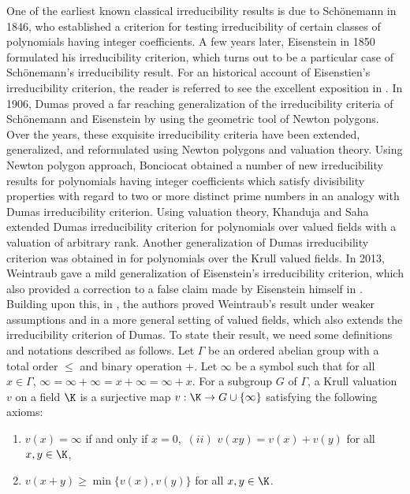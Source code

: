 \documentclass[12pt]{amsart}%
\begin{document}
One of the earliest known classical irreducibility results is due to Sch\"onemann \cite{S} in 1846, who established a criterion for testing irreducibility of certain classes of polynomials having integer coefficients. A few years later, Eisenstein \cite{E} in 1850  formulated his irreducibility criterion, which turns out to be a particular case of Sch\"onemann's irreducibility result. For an historical account of Eisenstien's irreducibility criterion, the reader is referred to see the excellent exposition in \cite{Cox}. In 1906, Dumas  \cite{D} proved a far reaching generalization of the irreducibility criteria of Sch\"onemann and  Eisenstein by using the geometric tool of Newton polygons. Over the years, these exquisite irreducibility criteria have been extended, generalized, and reformulated using Newton polygons and valuation theory. Using Newton polygon approach, Bonciocat \cite{B2015} obtained a number of new irreducibility results for polynomials having integer coefficients which satisfy divisibility properties with regard to two or more distinct prime numbers in an analogy with Dumas irreducibility criterion. Using valuation theory,  Khanduja and Saha \cite{KS} extended Dumas irreducibility criterion for polynomials over valued fields with a valuation of arbitrary rank.  Another generalization of Dumas irreducibility criterion was obtained in \cite[Theorem 1.1]{KK} for polynomials over the Krull valued fields. In 2013, Weintraub \cite{W} gave a mild generalization of Eisenstein's irreducibility criterion, which also provided a correction to a false claim made by Eisenstein himself in \cite{E}. Building upon this, in \cite{JK}, the authors proved Weintraub's result under weaker assumptions and in a more general setting of valued fields, which also extends the irreducibility criterion of Dumas. To state their result, we need some definitions and notations described as follows. Let $\Gamma$ be an ordered abelian group with a total order $\leq$ and binary operation $+$. Let $\infty$ be a symbol such that for all $x\in \Gamma$, $\infty=\infty+\infty=x+\infty=\infty+x$. For a subgroup $G$ of $\Gamma$, a Krull valuation $v$ on a field $\K$ is a surjective map $v:\K\rightarrow G\cup \{\infty\}$ satisfying the following axioms:
\begin{enumerate}
\item[$(i)$] $v(x)=\infty$ if and only if $x=0$,~$(ii)$ $v(xy)=v(x)+v(y)$ for all $x,y\in \K$,
\item[$(iii)$] $v(x+y)\geq \min\{v(x),v(y)\}$ for all $x,y\in\K$.
\end{enumerate}
\end{document}
